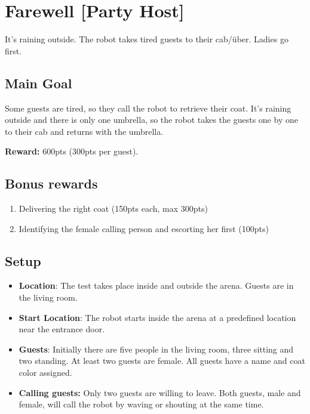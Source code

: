 \section{Farewell [Party Host]}
It's raining outside. The robot takes tired guests to their cab/über. Ladies go first.


\subsection{Main Goal}
Some guests are tired, so they call the robot to retrieve their coat.
It's raining outside and there is only one umbrella, so the robot takes the guests one by one to their cab and returns with the umbrella.

\noindent\textbf{Reward:} 600pts (300pts per guest).

\subsection{Bonus rewards}
\begin{enumerate}[nosep]
	\item Delivering the right coat (150pts each, max 300pts)
	\item Identifying the female calling person and escorting her first (100pts)
\end{enumerate}


\subsection{Setup}
\begin{itemize}
	\item \textbf{Location}: The test takes place inside and outside the arena.
	Guests are in the living room.

	\item \textbf{Start Location}: The robot starts inside the arena at a predefined location near the entrance door.

	\item \textbf{Guests}: Initially there are five people in the living room, three sitting and two standing.
	At least two guests are female.
	All guests have a name and coat color assigned.

	\item \textbf{Calling guests:} Only two guests are willing to leave. Both guests, male and female, will call the robot by waving or shouting at the same time.
\end{itemize}

